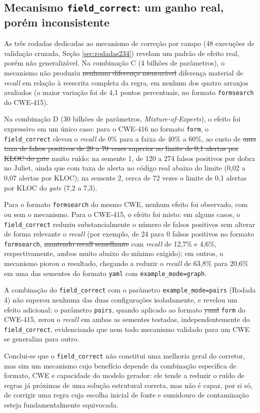 \documentclass[
    12pt,                %
    openright,           %
    oneside,             %
    a4paper,             %
    english,             %
    brazil               %
]{abntex2}
\newcommand{\antigo}[1]{\sout{#1}}
\newcommand{\novo}[1]{{\color{red}#1}}
\begin{document}
\subsection{Mecanismo \texttt{field\_correct}: um ganho real, porém inconsistente}
\label{sec:resultadosfieldcorrect}
\par
As três rodadas dedicadas ao mecanismo de correção por campo (48 execuções de validação cruzada, Seção \ref{sec:rodadas234}) revelam um padrão de efeito real, porém não generalizável.
Na combinação C (4 bilhões de parâmetros), o mecanismo não produziu \antigo{nenhuma diferença mensurável} \novo{diferença material} de \textit{recall} em relação à reescrita completa da regra, em nenhum dos quatro arranjos avaliados\novo{ (a maior variação foi de 4,1 pontos percentuais, no formato \texttt{formsearch} do CWE-415)}.
\par
Na combinação D (30 bilhões de parâmetros, \textit{Mixture-of-Experts}), o efeito foi expressivo em um único caso: para o CWE-416 no formato \texttt{form}, o \texttt{field\_correct} elevou o \textit{recall} de 0\% para a faixa de 40\% a 60\%, ao custo de \antigo{uma taxa de falsos positivos de 20 a 70 vezes superior ao limite de 0,1 alertas por KLOC do gate} \novo{muito ruído: na semente 1, de 120 a 274 falsos positivos por dobra no Juliet, ainda que com taxa de alerta no código real abaixo do limite (0,02 a 0,07 alertas por KLOC); na semente 2, cerca de 72 vezes o limite de 0,1 alertas por KLOC do \textit{gate} (7,2 a 7,3)}.
\par
Para o formato \texttt{formsearch} do mesmo CWE, nenhum efeito foi observado, com ou sem o mecanismo.
Para o CWE-415, o efeito foi misto: em alguns casos, o \texttt{field\_correct} reduziu substancialmente o número de falsos positivos sem alterar de forma relevante o \textit{recall} (por exemplo, de 24 para 0 falsos positivos no formato \texttt{formsearch}, \antigo{mantendo recall semelhante} \novo{com \textit{recall} de 12,7\% e 4,6\%, respectivamente, ambos muito abaixo do mínimo exigido}); em outros, o mecanismo piorou o resultado, chegando a reduzir o \textit{recall} de 63,8\% para 20,6\% em uma das sementes do formato \texttt{yaml}\novo{ com \texttt{example\_mode=graph}}.
\par
A combinação do \texttt{field\_correct} com o parâmetro \texttt{example\_mode=pairs} (Rodada 4) não superou nenhuma das duas configurações isoladamente, e revelou um efeito adicional: o parâmetro \texttt{pairs}, quando aplicado ao formato \antigo{yaml} \novo{\texttt{form}} do CWE-415, zerou o \textit{recall} em ambas as sementes testadas, independentemente do \texttt{field\_correct}, evidenciando que nem todo mecanismo validado para um CWE se generaliza para outro.
\par
Conclui-se que o \texttt{field\_correct} não constitui uma melhoria geral do corretor, mas sim um mecanismo cujo benefício depende da combinação específica de formato, CWE e capacidade do modelo gerador: ele tende a reduzir o ruído de regras já próximas de uma solução estrutural correta, mas não é capaz, por si só, de corrigir uma regra cuja escolha inicial de fonte e sumidouro de contaminação esteja fundamentalmente equivocada.
\end{document}
